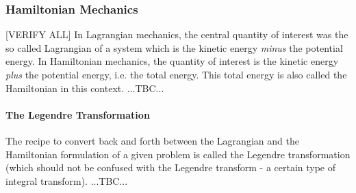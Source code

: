 %


\subsubsection{Hamiltonian Mechanics} [VERIFY ALL]
In Lagrangian mechanics, the central quantity of interest was the so called Lagrangian of a system which is the kinetic energy \emph{minus} the potential energy. In Hamiltonian mechanics, the quantity of interest is the kinetic energy \emph{plus} the potential energy, i.e. the total energy. This total energy is also called the Hamiltonian in this context. ...TBC...

\paragraph{The Legendre Transformation}
The recipe to convert back and forth between the Lagrangian and the Hamiltonian formulation of a given problem is called the Legendre transformation (which should not be confused with the Legendre transform - a certain type of integral transform). ...TBC...





